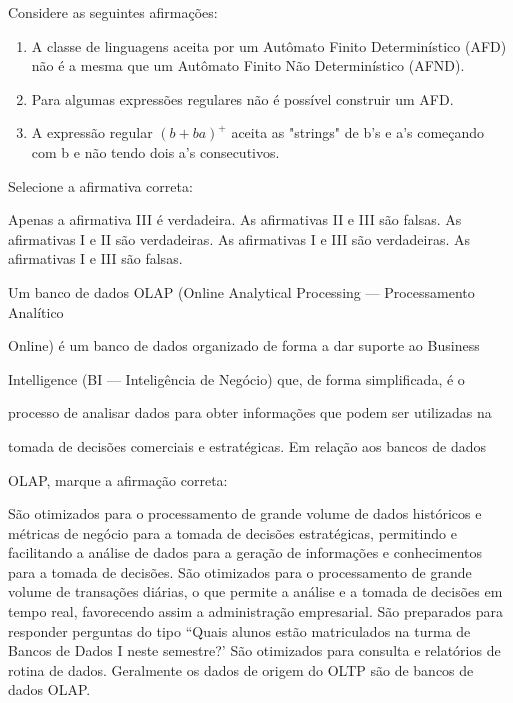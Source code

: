 \documentclass[12pt, addpoints]{exam}
\begin{document}
\begin{questions}
\question

Considere as seguintes afirmações:

\begin{enumerate}[label=\Roman*.]

    \item A classe de linguagens aceita por um Autômato Finito Determinístico (AFD) não é a mesma que um Autômato Finito Não Determinístico (AFND).

    \item Para algumas expressões regulares não é possível construir um AFD.

    \item A expressão regular \((b + ba)^+\) aceita as "strings" de b's e a's começando com b e não tendo dois a's consecutivos.

\end{enumerate}

Selecione a afirmativa correta:
\begin{choices}
\choice Apenas a afirmativa III é verdadeira.
\choice As afirmativas II e III são falsas.
\choice As afirmativas I e II são verdadeiras.
\choice As afirmativas I e III são verdadeiras.
\choice As afirmativas I e III são falsas.
\end{choices}

\question

Um banco de dados OLAP (Online Analytical Processing --- Processamento Analítico

Online) é um banco de dados organizado de forma a dar suporte ao Business

Intelligence (BI --- Inteligência de Negócio) que, de forma simplificada, é o

processo de analisar dados para obter informações que podem ser utilizadas na

tomada de decisões comerciais e estratégicas. Em relação aos bancos de dados

OLAP, marque a afirmação correta:
\begin{choices}
\choice São otimizados para o processamento de grande volume de dados históricos e métricas de negócio para a tomada de decisões estratégicas, permitindo e facilitando a análise de dados para a geração de informações e conhecimentos para a tomada de decisões.
\choice São otimizados para o processamento de grande volume de transações diárias, o que permite a análise e a tomada de decisões em tempo real, favorecendo assim a administração empresarial.
\choice São preparados para responder perguntas do tipo ``Quais alunos estão matriculados na turma de Bancos de Dados I neste semestre?'
\choice São otimizados para consulta e relatórios de rotina de dados.
\choice Geralmente os dados de origem do OLTP são de bancos de dados OLAP.
\end{choices}


\end{questions}
\end{document}
